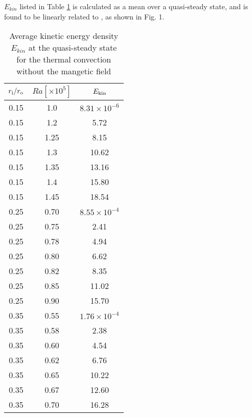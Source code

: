 $E_{kin}$ listed in Table \ref{table:Rac} is calculated as a mean over a quasi-steady state, and is found to be linearly related to , as shown in Fig. 1.
%
%
\begin{table}
\caption{Average kinetic energy density $E_{kin}$ at the quasi-steady state \\
for the thermal convection without the mangetic field}
\begin{center}
\begin{tabular}{|ccc||}
   \hline
  $r_{\rm i}/r_{\rm o}$ & $Ra[\times 10^5] $ &  $E_{\rm kin}$ \\
    \hline \hline
 0.15  &  1.0  &  $8.31 \times 10^{-6}$ \\
 0.15  &  1.2  &  5.72 \\
 0.15  &  1.25 &  8.15 \\
 0.15  &  1.3  &  10.62 \\
 0.15  &  1.35 &  13.16 \\
 0.15  &  1.4  &  15.80 \\
 0.15  &  1.45  &  18.54 \\
 \hline
%
 0.25  &  0.70 &  $8.55 \times 10^{-4}$ \\
 0.25  &  0.75 &  2.41 \\
 0.25  &  0.78  &  4.94 \\
 0.25  &  0.80  &  6.62 \\
 0.25  &  0.82  & 8.35 \\
 0.25  &  0.85  &  11.02 \\
 0.25  &  0.90  &  15.70 \\
 \hline
%
 0.35  &  0.55  &  $1.76 \times 10^{-4}$ \\
 0.35  &  0.58  &  2.38  \\
 0.35  &  0.60  &  4.54  \\
 0.35  &  0.62  &  6.76 \\
 0.35  &  0.65  &  10.22 \\
 0.35  &  0.67  &  12.60\\
 0.35  &  0.70  &  16.28 \\
 \hline
 \hline
\end{tabular}
\end{center}
\label{table:Rac}
\end{table}
%
%
